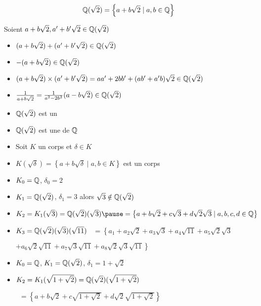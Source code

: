 \begin{frame}

$$\mathbb{Q}(\sqrt 2) = \left\{ a+b\sqrt 2 \mid a,b \in \mathbb{Q} \right\}$$


\pause

Soient $a+b\sqrt 2, a'+b'\sqrt 2 \in \mathbb{Q}(\sqrt 2)$ 
\pause
\begin{itemize}
  \item $(a+b\sqrt 2)+(a'+b'\sqrt 2) \in \mathbb{Q}(\sqrt 2)$
  \pause
  \item $-(a+b\sqrt 2) \in \mathbb{Q}(\sqrt 2)$
  \pause  
  \item $(a+b\sqrt 2)\times(a'+b'\sqrt 2) = aa'+2bb' + (ab'+a'b)\sqrt 2 \in \mathbb{Q}(\sqrt 2)$
  \pause
  \item $\frac{1}{a+b\sqrt 2} = \frac{1}{a^2-2b^2}(a-b\sqrt 2)\in \mathbb{Q}(\sqrt 2)$
\end{itemize}

\bigskip
\pause
 
\begin{itemize}
  \item $\mathbb{Q}(\sqrt 2)$ est un 
  \pause
  \item $\mathbb{Q}(\sqrt 2)$ est une  de $\mathbb{Q}$
\end{itemize}

\end{frame}


\begin{frame}

\pause
\begin{itemize}
  \item Soit $K$ un corps et $\delta \in K$
  \pause
  \item $K(\sqrt \delta) = \left\{ a+b\sqrt \delta \mid a,b \in K \right\}$ est un corps
  \pause
  \item $K_0 = \mathbb{Q}$, $\delta_0 = 2$
  \pause
  \item $K_1 = \mathbb{Q}(\sqrt 2)$\pause, $\delta_1 = 3$ alors $\sqrt 3 \notin \mathbb{Q}(\sqrt 2)$
  \pause
  \item $K_2 = K_1(\sqrt 3) = \Qq(\sqrt2)(\sqrt 3) 
    \pause = \left\{ a+b\sqrt 2 + c\sqrt 3 + d\sqrt 2 \sqrt 3 \mid a,b,c,d \in \Qq \right\}$
  \pause
  \item $K_3 = \mathbb{Q}(\sqrt2)(\sqrt 3)(\sqrt {11})$
  \pause
  \quad\  $= \left\{ a_1+a_2\sqrt 2 + a_3\sqrt 3 + a_4\sqrt{11}+ a_5\sqrt 2 \sqrt 3 \right. $
  
  \qquad\qquad $\left.+ a_6\sqrt 2 \sqrt {11} + a_7\sqrt 3 \sqrt {11} + a_8\sqrt 2 \sqrt 3 \sqrt {11} \right\}$
  \pause
  \item $K_0 = \mathbb{Q}$, $K_1 = \mathbb{Q}(\sqrt 2)$, $\delta_1=1+\sqrt2$
  \pause
  \item $K_2=K_1(\sqrt{1+\sqrt2}) = \mathbb{Q}(\sqrt2)(\sqrt{1+\sqrt2})$
  
  \pause
  \quad\  $= \left\{ a+b\sqrt 2 + c\sqrt{1+\sqrt2} + d\sqrt 2\sqrt{1+\sqrt2} \right\}$ 
\end{itemize}

\end{frame}

